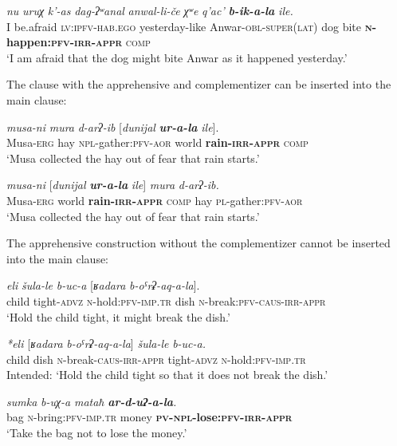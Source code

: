 ﻿\documentclass[output=paper]{langsci/langscibook}
\begin{document}
\ex \label{ex:5:197} %
\gll \emph{nu} \emph{uruχ} \emph{k'-as} \emph{dag-ʔʷanal} \emph{anwal-li-če} \emph{χʷe} \emph{q'ac'} \emph{\textbf{b-ik-a-la}} \emph{ile.}\\
 I be.afraid \textsc{lv}:\textsc{ipfv}-\textsc{hab}.\textsc{ego} yesterday-like Anwar-\textsc{obl}-\textsc{super}(\textsc{lat}) dog bite \textbf{\textsc{n}-happen:\textsc{pfv}-\textsc{irr}-\textsc{appr}} \textsc{comp} \\
\glt `I am afraid that the dog might bite Anwar as it happened yesterday.'
\z

The clause with the apprehensive and complementizer can be inserted into
the main clause:

\ea %
\gll \emph{musa-ni}  \emph{mura} \emph{d-arʔ-ib} [\emph{dunijal} \emph{\textbf{ur-a-la}} \emph{ile}].\\
 Musa-\textsc{erg} hay \textsc{npl}-gather:\textsc{pfv}-\textsc{aor} world \textbf{rain-\textsc{irr}-\textsc{appr}} \textsc{comp}\\
\glt `Musa collected the hay out of fear that rain starts.'

\ex %
\gll \emph{musa-ni}  [\emph{dunijal} \emph{\textbf{ur-a-la}} \emph{ile}] \emph{mura} \emph{d-arʔ-ib.}\\
 Musa-\textsc{erg} world \textbf{rain-\textsc{irr}-\textsc{appr}} \textsc{comp} hay \textsc{pl}-gather:\textsc{pfv}-\textsc{aor}\\
\glt `Musa collected the hay out of fear that rain starts.'
\z

The apprehensive construction without the complementizer cannot be
inserted into the main clause:

\ea %
\gll \emph{eli} \emph{šula-le} \emph{b-uc-a} [\emph{ʁadara} \emph{b-oˤrʡ-aq-a-la}].\\
 child tight-\textsc{advz} \textsc{n}-hold:\textsc{pfv}-\textsc{imp}.\textsc{tr} dish \textsc{n}-break:\textsc{pfv}-\textsc{caus}-\textsc{irr}-\textsc{appr}\\
\glt `Hold the child tight, it might break the dish.'

\ex %
\gll \emph{*eli} [\emph{ʁadara} \emph{b-oˤrʡ-aq-a-la}] \emph{šula-le} \emph{b-uc-a.}\\
 child dish \textsc{n}-break-\textsc{caus}-\textsc{irr}-\textsc{appr} tight-\textsc{advz} \textsc{n}-hold:\textsc{pfv}-\textsc{imp}.\textsc{tr}\\
\glt Intended: `Hold the child tight so that it does not break the dish.'

\ex %
\gll \emph{sumka} \emph{b-uχ-a} \emph{mataħ} \emph{\textbf{ar-d-uʔ-a-la}.}\\
 bag \textsc{n}-bring:\textsc{pfv}-\textsc{imp}.\textsc{tr} money \textbf{\textsc{pv}-\textsc{npl}-lose:\textsc{pfv}-\textsc{irr}-\textsc{appr}}\\
\glt `Take the bag not to lose the money.'
\end{document}
